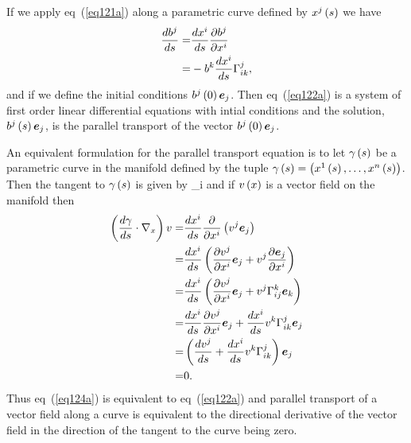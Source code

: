 If we apply eq~(\ref{eq121a}) along a parametric curve defined by ${x^{j}}\left ( {s} \right )$ we have
\begin{align}
	\displaystyle\frac{d{b^{j}}}{d{s}}{} =& \displaystyle\frac{d{x^{i}}}{d{s}}{}\displaystyle\frac{\partial{b^{j}}}{\partial{x^{i}}} \nonumber \\
	                   =& -b^{k}\displaystyle\frac{d{x^{i}}}{d{s}}{}\Gamma_{ik}^{j}, \label{eq122a}
\end{align}
and if we define the initial conditions ${b^{j}}\left ( {0} \right )\bm{e}_{j}$.  Then eq~(\ref{eq122a}) is a system of first order
linear differential equations with intial conditions and the solution, ${b^{j}}\left ( {s} \right )\bm{e}_{j}$, is the parallel transport of the
vector ${b^{j}}\left ( {0} \right )\bm{e}_{j}$.

An equivalent formulation for the parallel transport equation is to let ${\gamma}\left ( {s} \right )$ be a parametric curve in the manifold
defined by the tuple ${\gamma}\left ( {s} \right ) = \left ( {{x^{1}}\left ( {s} \right ),\dots,{x^{n}}\left ( {s} \right )} \right )$.  Then the tangent to ${\gamma}\left ( {s} \right )$ is given by
\be
	 \equiv {}\eb_{i}
\ee
and if ${v}\left ( {x} \right )$ is a vector field on the manifold then
\begin{align}
	\left ( {\displaystyle\frac{d{\gamma}}{d{s}}{}\cdot\nabla_{x}} \right ) v =& \displaystyle\frac{d{x^{i}}}{d{s}}{}\displaystyle\frac{\partial{}}{\partial{x^{i}}}\left ( {v^{j}\bm{e}_{j}} \right ) \nonumber \\
	     =&\displaystyle\frac{d{x^{i}}}{d{s}}{}\left ( {\displaystyle\frac{\partial{v^{j}}}{\partial{x^{i}}}\bm{e}_{j}+v^{j}\displaystyle\frac{\partial{\bm{e}_{j}}}{\partial{x^{i}}}} \right ) \nonumber \\
	     =&\displaystyle\frac{d{x^{i}}}{d{s}}{}\left ( {\displaystyle\frac{\partial{v^{j}}}{\partial{x^{i}}}\bm{e}_{j}+v^{j}\Gamma^{k}_{ij}\bm{e}_{k}} \right ) \nonumber \\
	     =&\displaystyle\frac{d{x^{i}}}{d{s}}{}\displaystyle\frac{\partial{v^{j}}}{\partial{x^{i}}}\bm{e}_{j}+\displaystyle\frac{d{x^{i}}}{d{s}}{}v^{k}\Gamma^{j}_{ik}\bm{e}_{j} \nonumber \\
	     =&\left ( {\displaystyle\frac{d{v^{j}}}{d{s}}{}+\displaystyle\frac{d{x^{i}}}{d{s}}{}v^{k}\Gamma^{j}_{ik}} \right )\bm{e}_{j} \nonumber \\
	     =& 0. \label{eq124a}
\end{align}
Thus eq~(\ref{eq124a}) is equivalent to eq~(\ref{eq122a}) and parallel transport of a vector field along a curve is 
equivalent to the directional derivative of the vector field in the direction of the tangent to the curve being zero.  

